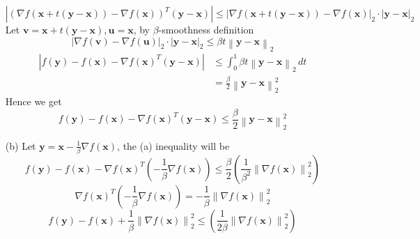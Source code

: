 \documentclass[12pt,a4paper]{article}
\begin{document}
\begin{enumerate}
        \begin{equation*}
            \left\lvert (\nabla f(\mathbf{x} + t(\mathbf{y}-\mathbf{x})) - \nabla f(\mathbf{x}))^T(\mathbf{y}-\mathbf{x})\right\rvert \leq |\nabla f(\mathbf{x} + t(\mathbf{y} - \mathbf{x})) - \nabla f(\mathbf{x})|_2 \cdot |\mathbf{y} - \mathbf{x}|_2
        \end{equation*}
        Let $\mathbf{v} = \mathbf{x} + t(\mathbf{y}-\mathbf{x}), \mathbf{u}=\mathbf{x}$, by $\beta$-smoothness definition
        \begin{equation*}
            |\nabla f(\mathbf{v}) - \nabla f(\mathbf{u})|_2 \cdot |\mathbf{y} - \mathbf{x}|_2 \leq \beta t \left\lVert \mathbf{y} - \mathbf{x}\right\rVert _{2}
        \end{equation*}
        \begin{equation*}
            \begin{split}
                |f(\mathbf{y}) - f(\mathbf{x}) - \nabla f(\mathbf{x})^T(\mathbf{y}-\mathbf{x})| 
                    &\leq \int_{0}^{1} \beta t \left\lVert \mathbf{y} - \mathbf{x}\right\rVert _{2} \,dt \\
                    &= \frac{\beta}{2} \left\lVert \mathbf{y} - \mathbf{x}\right\rVert _{2}^{2}
            \end{split}
        \end{equation*}
        Hence we get
        \begin{equation*}
            f(\mathbf{y}) - f(\mathbf{x}) - \nabla f(\mathbf{x})^T(\mathbf{y}-\mathbf{x}) \leq \frac{\beta}{2} \left\lVert \mathbf{y} - \mathbf{x}\right\rVert _{2}^{2}
        \end{equation*}
    \item[(b)]
        Let $\mathbf{y} = \mathbf{x} - \frac{1}{\beta} \nabla f(\mathbf{x})$, the (a) inequality will be
        \begin{equation*}
            f(\mathbf{y}) - f(\mathbf{x}) - \nabla f(\mathbf{x})^T \left( - \frac{1}{\beta} \nabla f(\mathbf{x}) \right) \le \frac{\beta}{2} \left( \frac{1}{\beta^2} \left\lVert \nabla f(\mathbf{x})\right\rVert _2^2 \right)
        \end{equation*}
        \begin{equation*}
            \nabla f(\mathbf{x})^T \left( - \frac{1}{\beta} \nabla f(\mathbf{x}) \right) = -\frac{1}{\beta}\left\lVert \nabla f(\mathbf{x})\right\rVert _{2}^{2}
        \end{equation*}
        \begin{equation*}
            f(\mathbf{y}) - f(\mathbf{x}) + \frac{1}{\beta}\left\lVert \nabla f(\mathbf{x})\right\rVert _{2}^{2} \le  \left( \frac{1}{2\beta} \left\lVert \nabla f(\mathbf{x})\right\rVert _2^2 \right)

\end{equation*}
\end{enumerate}
\end{document}
